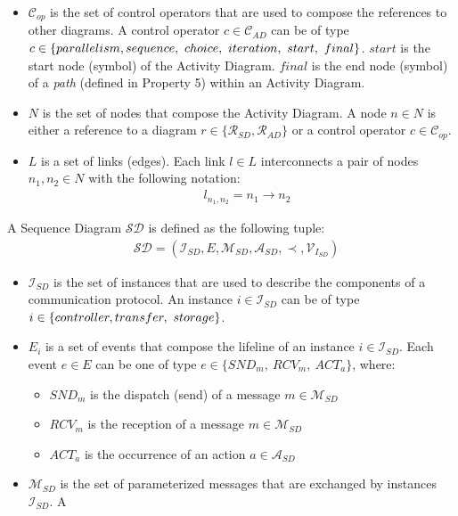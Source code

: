 \documentclass{llncs}
\begin{document}
\begin{subappendices}
\begin{itemize}
	\item $\mathcal{C}_{op}$ is the set of control operators that are used to compose the references to other diagrams. A control
	operator $c \in \mathcal{C}_{AD}$ can be of type $c \in \{parallelism,\\sequence,\ choice,\ iteration,\ start,\ final\}$.
	$start$ is the start node (symbol) of the Activity Diagram. $final$ is the end node (symbol) of a \textit{path} (defined in
	Property 5) within an Activity Diagram.
	\item $N$ is the set of nodes that compose the Activity Diagram. A node $n \in N$ is either a reference to a diagram $r \in
	\{\mathcal{R}_{SD}, \mathcal{R}_{AD}\}$ or a
	control operator $c \in \mathcal{C}_{op}$.
	\item $L$ is a set of links (edges). Each link $l \in L$ interconnects a pair of nodes $n_1, n_2 \in N$ with the following
	notation:
		\begin{align*}
			&l_{n_1,n_2} = n_1 \rightarrow n_2
		\end{align*}
\end{itemize}
%
A Sequence Diagram $\mathcal{SD}$ is defined as the following tuple:
%
\begin{align*}
&\mathcal{SD} = ( \mathcal{I}_{SD}, E, \mathcal{M}_{SD}, \mathcal{A}_{SD}, \prec, \mathcal{V}_{{I}_{SD}} )
\end{align*}
%
%
\begin{itemize}
	\item $\mathcal{I}_{SD}$ is the set of instances that are used to describe the components of a communication protocol. An
	instance $i \in \mathcal{I}_{SD}$ can be of type $i \in \{controller,\\transfer,\ storage\}$.
	\item $E_i$ is a set of events that compose the lifeline of an instance $i \in \mathcal{I}_{SD}$. Each event $e \in E$ can be
	one of type $e \in \{SND_{m},\ RCV_{m},\ ACT_{a}\}$, where:
	\begin{itemize}
		\item $SND_{m}$ is the dispatch (send) of a message $m \in \mathcal{M}_{SD}$
		\item $RCV_{m}$ is the reception of a message $m \in \mathcal{M}_{SD}$ 
		\item $ACT_{a}$ is the occurrence of an action $a \in \mathcal{A}_{SD}$
	\end{itemize}
	\item $\mathcal{M}_{SD}$ is the set of parameterized messages that are exchanged by instances $\mathcal{I}_{SD}$. A

\end{itemize}
\end{subappendices}
\end{document}
